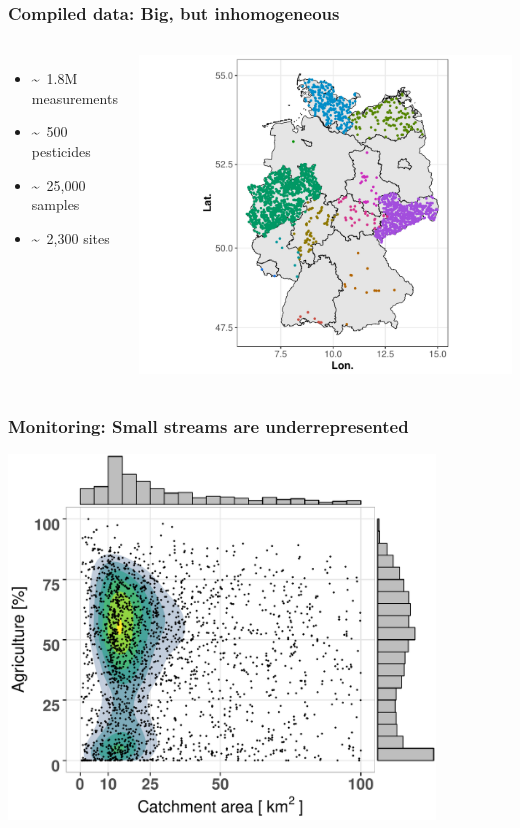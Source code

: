 \documentclass[
	12pt
	]{beamer}
\begin{document}
\begin{frame}
\frametitle{Compiled data: Big, but inhomogeneous}
	\begin{columns}
	    	\begin{itemize}
	    		\item \textasciitilde~1.8M measurements 
	    		\item \textasciitilde~500 pesticides 
	    		\item \textasciitilde~25,000 samples 
	    		\item \textasciitilde~2,300 sites
	    	\end{itemize}
	    	\vspace*{5mm}
	    	\hspace*{-10mm}\includegraphics[width = 1.4\textwidth]{figs/map_phch.pdf}
	 \end{columns}
\end{frame}


\begin{frame}
\frametitle{Monitoring: Small streams are underrepresented}
	\includegraphics[width = 0.85\textwidth]{figs/distribution.pdf}
\end{frame}
\end{document}
